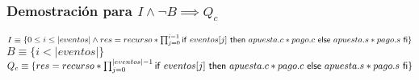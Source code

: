 \documentclass[10pt,a4paper]{article}
\begin{document}
\begin{minipage}[t]{18cm}
\subsubsection*{Demostración para $I \land \neg B \implies Q_c$}
$I \equiv \{0 \leq i \leq |eventos| \land res = recurso * \prod_{j = 0}^{i - 1} \mathsf{if}\ eventos[j]\ \mathsf{then}\ apuesta.c *pago.c\ \mathsf{else}\ apuesta.s * pago.s\ \mathsf{fi}\}$ \\
$B \equiv \{i < |eventos|\}$ \\
$Q_c \equiv \{res = recurso * \prod_{j = 0}^{|eventos| - 1} \mathsf{if}\ eventos[j]\ \mathsf{then}\ apuesta.c *pago.c\ \mathsf{else}\ apuesta.s * pago.s\ \mathsf{fi}\}$
\end{minipage}
\end{document}
